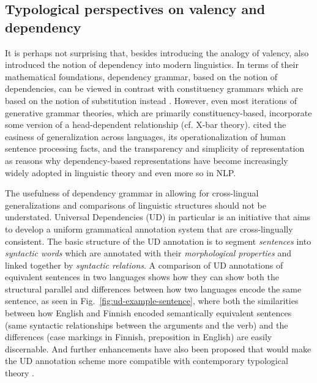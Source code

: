 \subsection{Typological perspectives on valency and dependency}\label{subsec:typology}

It is perhaps not surprising that, besides introducing the analogy of valency, \citet{tesniere1959} also introduced the notion of dependency into modern linguistics. In terms of their mathematical foundations, dependency grammar, based on the notion of dependencies, can be viewed in contrast with constituency grammars which are based on the notion of substitution instead \citep{stabler2019}. However, even most iterations of generative grammar theories, which are primarily constituency-based, incorporate some version of a head-dependent relationship (cf. X-bar theory). \citet{demarneffe2019} cited the easiness of generalization across languages, its operationalization of human sentence processing facts, and the transparency and simplicity of representation as reasons why dependency-based representations have become increasingly widely adopted in linguistic theory and even more so in NLP.

The usefulness of dependency grammar in allowing for cross-lingual generalizations and comparisons of linguistic structures should not be understated. Universal Dependencies (UD) \citep{nivre2015,demarneffe2021} in particular is an initiative that aims to develop a uniform grammatical annotation system that are cross-lingually consistent. The basic structure of the UD annotation is to segment \textit{sentences} into \textit{syntactic words} which are annotated with their \textit{morphological properties} and linked together by \textit{syntactic relations}. A comparison of UD annotations of equivalent sentences in two languages shows how they can show both the structural parallel and differences between how two languages encode the same sentence, as seen in Fig.~\ref{fig:ud-example-sentence}, where both the similarities between how English and Finnish encoded semantically equivalent sentences (same syntactic relationships between the arguments and the verb) and the differences (case markings in Finnish, preposition in English) are easily discernable. And further enhancements have also been proposed that would make the UD annotation scheme more compatible with contemporary typological theory \citep{croft2017}.

